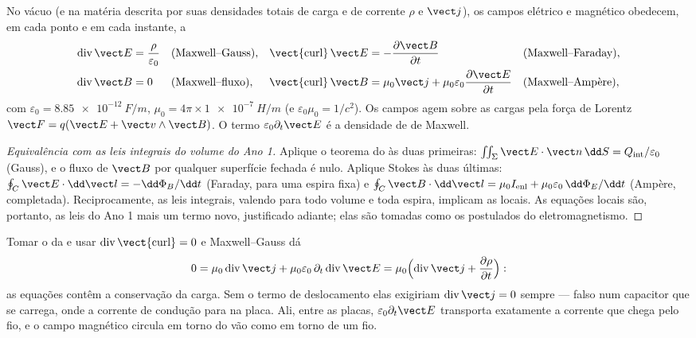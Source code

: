 \begin{theorem}\label{thm:b2:maxwell-equations:maxwell}
No vácuo (e na matéria descrita por suas densidades totais de carga e de
corrente $\rho$ e $\vect j$), os campos elétrico e magnético obedecem, em
cada ponto e em cada instante, a
\begin{align*}
\operatorname{div}\vect E &= \frac\rho{\varepsilon_0} &&\text{(Maxwell--Gauss)} , &
\operatorname{\vect{curl}}\vect E &= -\frac{\partial\vect B}{\partial t} &&\text{(Maxwell--Faraday)} ,\\
\operatorname{div}\vect B &= 0 &&\text{(Maxwell--fluxo)} , &
\operatorname{\vect{curl}}\vect B &= \mu_0\vect j + \mu_0\varepsilon_0\frac{\partial\vect E}{\partial t} &&\text{(Maxwell--Ampère)} ,
\end{align*}
com $\varepsilon_0 = \qty{8.85e-12}{F/m}$, $\mu_0 = 4\pi \times \qty{1e-7}{H/m}$ (e
$\varepsilon_0\mu_0 = 1/c^2$). Os campos agem sobre as cargas pela força de
Lorentz $\vect F = q(\vect E + \vect v\wedge\vect B)$. O termo $\varepsilon_0\partial_t\vect E$
é a densidade de \emph{} de Maxwell.
\end{theorem}

\begin{proof}[Equivalência com as leis integrais do volume do Ano 1]
Aplique o teorema do  às duas primeiras: $\iint_\Sigma\vect E\cdot
\vect n\,\dd S = Q_{\text{int}}/\varepsilon_0$ (Gauss), e o fluxo de $\vect B$
por qualquer superfície fechada é nulo. Aplique Stokes às duas últimas:
$\oint_C\vect E\cdot\dd\vect l = -\dd\Phi_B/\dd t$ (Faraday, para uma espira fixa)
e $\oint_C\vect B\cdot\dd\vect l = \mu_0I_{\text{enl}} + \mu_0\varepsilon_0\,\dd\Phi_E/\dd t$
(Ampère, completada). Reciprocamente, as leis integrais, valendo para todo
volume e toda espira, implicam as locais. As equações locais são, portanto,
as leis do Ano 1 mais um termo novo, justificado adiante; elas são tomadas como
os postulados do eletromagnetismo.
\end{proof}

\begin{proposition}\label{prop:b2:maxwell-equations:displacement}
Tomar o  da  e usar
$\operatorname{div}\operatorname{\vect{curl}} = 0$ e Maxwell--Gauss dá
\[
0 = \mu_0\operatorname{div}\vect j + \mu_0\varepsilon_0\,\partial_t\operatorname{div}\vect E
= \mu_0\Bigl(\operatorname{div}\vect j + \frac{\partial\rho}{\partial t}\Bigr) :
\]
as equações contêm a conservação da carga. Sem o termo de
deslocamento elas exigiriam $\operatorname{div}\vect j = 0$ sempre
--- falso num capacitor que se carrega, onde a corrente de condução para
na placa. Ali, entre as placas, $\varepsilon_0\partial_t\vect E$ transporta
exatamente a corrente que chega pelo fio, e o campo magnético
circula em torno do vão como em torno de um fio.
\end{proposition}

